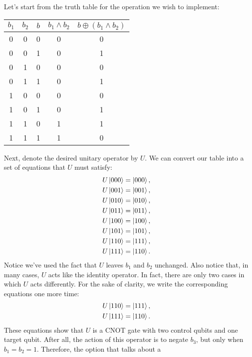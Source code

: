 \documentclass[10pt]{article}
\begin{document}
Let's start from the truth table for the operation we wish to implement:
\begin{center}
\begin{tabular}{|c|c|c|c|c|}
\hline
\(b_1\) & \(b_2\) & \(b\) & \(b_1\wedge b_2\) & \(b\oplus(b_1\wedge b_2)\)\\
\hline
0 & 0 & 0 & 0 & 0\\
0 & 0 & 1 & 0 & 1\\
0 & 1 & 0 & 0 & 0\\
0 & 1 & 1 & 0 & 1\\
1 & 0 & 0 & 0 & 0\\
1 & 0 & 1 & 0 & 1\\
1 & 1 & 0 & 1 & 1\\
1 & 1 & 1 & 1 & 0\\
\hline
\end{tabular}
\end{center}
Next, denote the desired unitary operator by \(U\). We can convert our table
into a set of equations that \(U\) must satisfy:
\begin{align}
  \begin{split}
    U\ket{000}&=\ket{000},\\
    U\ket{001}&=\ket{001},\\
    U\ket{010}&=\ket{010},\\
    U\ket{011}&=\ket{011},\\
    U\ket{100}&=\ket{100},\\
    U\ket{101}&=\ket{101},\\
    U\ket{110}&=\ket{111},\\
    U\ket{111}&=\ket{110}.
  \end{split}
\end{align}
Notice we've used the fact that \(U\) leaves \(b_1\) and \(b_2\)
unchanged. Also notice that, in many cases, \(U\) acts like the identity
operator. In fact, there are only two cases in which \(U\) acts differently.
For the sake of clarity, we write the corresponding equations one more time:
\begin{align}
  \begin{split}
    U\ket{110}&=\ket{111},\\
    U\ket{111}&=\ket{110}.
  \end{split}
\end{align}
These equations show that \(U\) is a CNOT gate with two control qubits and one
target qubit. After all, the action of this operator is to negate \(b_3\), but
only when \(b_1=b_2=1\). Therefore, the option that talks about a
\end{document}
